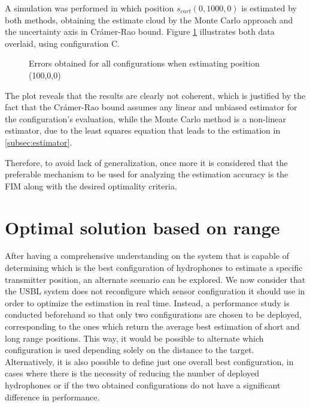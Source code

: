 A simulation was performed in which position $s_{cart}(0,1000,0)$ is estimated by both methods, obtaining the estimate cloud by the Monte Carlo approach and the uncertainty axis in Crámer-Rao bound. Figure \ref{fig:compare-cramer-monte-0,1000,0-C} illustrates both data overlaid, using configuration C.

\begin{figure}[!htbp]
	\captionsetup{justification=centering,margin=2cm}
	\caption{Errors obtained for all configurations when estimating position (100,0,0)}
	\label{fig:compare-cramer-monte-0,1000,0-C}
\end{figure}

The plot reveals that the results are clearly not coherent, which is justified by the fact that the Crámer-Rao bound assumes any linear and unbiased estimator for the configuration's evaluation, while the Monte Carlo method is a non-linear estimator, due to the least squares equation that leads to the estimation in \ref{subsec:estimator}.

Therefore, to avoid lack of generalization, once more it is considered that the preferable mechanism to be used for analyzing the estimation accuracy is the FIM along with the desired optimality criteria.

\section{Optimal solution based on range} \label{subsec:opt-range}

After having a comprehensive understanding on the system that is capable of determining which is the best configuration of hydrophones to estimate a specific transmitter position, an alternate scenario can be explored. We now consider that the USBL system does not reconfigure which sensor configuration it should use in order to optimize the estimation  in real time. Instead, a performance study is conducted beforehand so that only two configurations are chosen to be deployed, corresponding to the ones which return the average best estimation of short and long range positions. This way, it would be possible to alternate which configuration is used depending solely on the distance to the target. Alternatively, it is also possible to define just one overall best configuration, in cases where there is the necessity of reducing the number of deployed hydrophones or if the two obtained configurations do not have a significant difference in performance.

